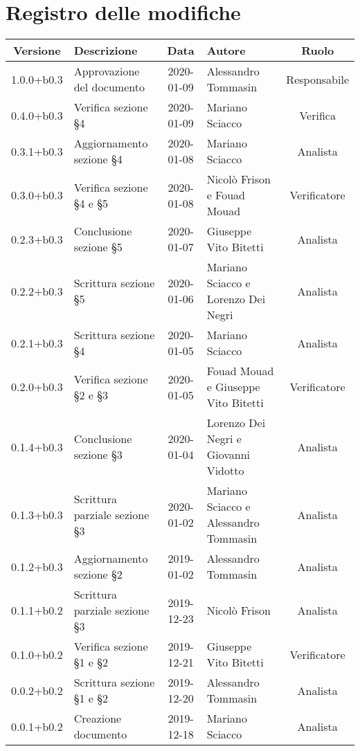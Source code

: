 \section*{Registro delle modifiche}

\begin{center}
	\begin{longtable}{|c|p{3cm}|c|p{4cm}|c|}
	\hline
	\rowcolor{lighter-grayer}
	\textbf{Versione} & \textbf{Descrizione} & \textbf{Data} & \textbf{Autore} & \textbf{Ruolo} \\
	\hline
	\endfirsthead

	1.0.0+b0.3 & Approvazione del documento & 2020-01-09 & Alessandro Tommasin & Responsabile \\
	\hline
	0.4.0+b0.3 & Verifica sezione \S4 & 2020-01-09 & Mariano Sciacco & Verifica \\
	\hline
	0.3.1+b0.3 & Aggiornamento sezione \S4 & 2020-01-08 & Mariano Sciacco & Analista \\
	\hline
	0.3.0+b0.3 & Verifica sezione \S4 e \S5 & 2020-01-08 & Nicolò Frison e Fouad Mouad & Verificatore \\
	\hline
	0.2.3+b0.3 & Conclusione sezione \S5 & 2020-01-07 & Giuseppe Vito Bitetti & Analista \\
	\hline
	0.2.2+b0.3 & Scrittura sezione \S5 & 2020-01-06 & Mariano Sciacco e Lorenzo Dei Negri & Analista \\
	\hline
	0.2.1+b0.3 & Scrittura sezione \S4 & 2020-01-05 & Mariano Sciacco & Analista \\
	\hline
	0.2.0+b0.3 & Verifica sezione \S2 e \S3 & 2020-01-05 & Fouad Mouad e Giuseppe Vito Bitetti & Verificatore \\
	\hline
	0.1.4+b0.3 & Conclusione sezione \S3 & 2020-01-04 & Lorenzo Dei Negri e Giovanni Vidotto & Analista \\
	\hline
	0.1.3+b0.3 & Scrittura parziale sezione \S3 & 2020-01-02 & Mariano Sciacco e Alessandro Tommasin & Analista \\
	\hline
	0.1.2+b0.3 & Aggiornamento sezione \S2 & 2019-01-02 & Alessandro Tommasin & Analista \\
	\hline
	0.1.1+b0.2 & Scrittura parziale sezione \S3 & 2019-12-23 & Nicolò Frison & Analista \\
	\hline
	0.1.0+b0.2 & Verifica sezione \S1 e \S2 & 2019-12-21 & Giuseppe Vito Bitetti & Verificatore \\
	\hline
	0.0.2+b0.2 & Scrittura sezione \S1 e \S2 & 2019-12-20 & Alessandro Tommasin & Analista \\
	\hline
	0.0.1+b0.2 & Creazione documento & 2019-12-18 & Mariano Sciacco & Analista \\
	\hline

	\end{longtable}
\end{center}
